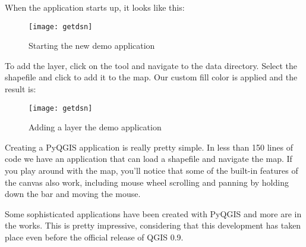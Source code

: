 When the application starts up, it looks like this:

\begin{figure}[ht]
\begin{center}
  \caption{Starting the new demo application}\label{fig:demo_app_startup}\smallskip
  \texttt{[image: getdsn]}
\end{center}
\end{figure}

To add the  layer, click on the 
 tool and navigate to the data directory.
Select the shapefile and click  to add it to the map. 
Our custom fill color is applied and the result is:

\begin{figure}[ht]
\begin{center}
  \caption{Adding a layer the demo application}\label{fig:demo_app_done}\smallskip
  \texttt{[image: getdsn]}
\end{center}
\end{figure}

Creating a PyQGIS application is really pretty simple. 
In less than 150 lines of code we have an application that can
load a shapefile and navigate the map. If you play around with the map, 
you'll notice that some of the built-in features
of the canvas also work, including mouse wheel scrolling and panning by 
holding down the  bar and
moving the mouse.

Some sophisticated applications have been created with PyQGIS and more are in 
the works. This is pretty impressive,
considering that this development has taken place even before the official 
release of QGIS 0.9.

\begin{Tip}\caption{\textsc{Documentation For PyQGIS}}
\end{Tip} 
